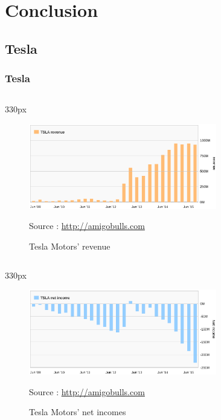     \section{Conclusion}

\subsection{Tesla}
\begin{frame}
\frametitle{Tesla}
\begin{center}
\begin{columns}
\begin{column}{330px}
{
    \begin{figure}[h!]
        \centering
        \includegraphics[width=310px]
            {images/TSLA-revenue-chart.eps}
        \vspace{-1em}
        \caption{Tesla Motors' revenue}
        \scriptsize{Source :
            \url{http://amigobulls.com}}
    \end{figure}
}
\end{column}
\end{columns}
\end{center}
\end{frame}


\begin{frame}
\begin{center}
\begin{columns}
\begin{column}{330px}
{
    \begin{figure}[h!]
        \centering
        \includegraphics[width=310px]
            {images/TSLA-netincome-chart.eps}
        \vspace{-1em}
        \caption{Tesla Motors' net incomes}
        \scriptsize{Source :
            \url{http://amigobulls.com}}
    \end{figure}
}
\end{column}
\end{columns}
\end{center}
\end{frame}

